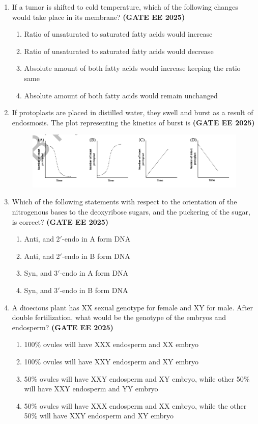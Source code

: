 \documentclass[journal,12pt,onecolumn]{IEEEtran}
\theoremstyle{remark}
\begin{document}
\begin{enumerate}
\item If a tumor is shifted to cold temperature, which of the following changes would take place in its membrane?  \hfill \textbf{(GATE EE 2025)}


\begin{enumerate}
\item Ratio of unsaturated to saturated fatty acids would increase  
\item Ratio of unsaturated to saturated fatty acids would decrease  
\item Absolute amount of both fatty acids would increase keeping the ratio same  
\item Absolute amount of both fatty acids would remain unchanged  
\end{enumerate}
 

\item If protoplasts are placed in distilled water, they swell and burst as a result of endosmosis. The plot representing the kinetics of burst is \hfill \textbf{(GATE EE 2025)}  
\begin{figure}[H]
    \centering
    \includegraphics[width=0.5\linewidth]{figs/fig4.png}
    \caption{ }
    \label{fig4}
\end{figure}

\item Which of the following statements with respect to the orientation of the nitrogenous bases to the deoxyribose sugars, and the puckering of the sugar, is correct?  
\hfill \textbf{(GATE EE 2025)}

\begin{enumerate}
\item Anti, and 2$'$-endo in A form DNA  
\item Anti, and 2$'$-endo in B form DNA  
\item Syn, and 3$'$-endo in A form DNA  
\item Syn, and 3$'$-endo in B form DNA  
\end{enumerate}


\item A dioecious plant has XX sexual genotype for female and XY for male. After double fertilization, what would be the genotype of the embryos and endosperm?  
\hfill \textbf{(GATE EE 2025)}

\begin{enumerate}
\item 100\% ovules will have XXX endosperm and XX embryo  
\item 100\% ovules will have XXY endosperm and XY embryo  
\item 50\% ovules will have XXY endosperm and XY embryo, while other 50\% will have XXY endosperm and YY embryo  
\item 50\% ovules will have XXX endosperm and XX embryo, while the other 50\% will have XXY endosperm and XY embryo  
\end{enumerate}



\end{enumerate}
\end{document}
